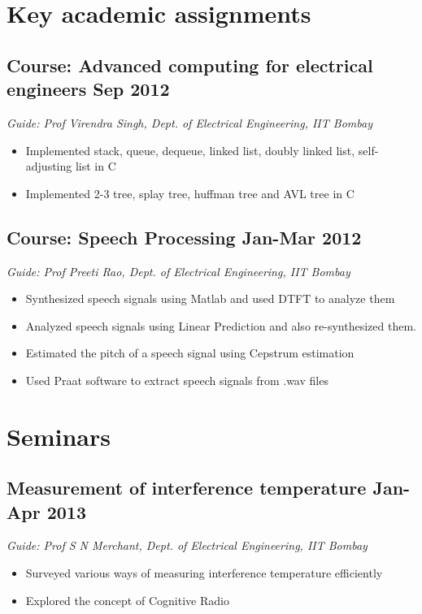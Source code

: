 \documentclass[12pt]{article}
\begin{document}
\section*{Key academic assignments}
\subsection*{Course: Advanced computing for electrical engineers \hfill Sep 2012}
\emph{Guide: Prof Virendra Singh, Dept. of Electrical Engineering, IIT Bombay}
\begin{itemize}
\item Implemented stack, queue, dequeue, linked list, doubly linked list, self-adjusting list in C
\item Implemented 2-3 tree, splay tree,  huffman tree and AVL tree in C
\end{itemize}

\subsection*{Course: Speech Processing \hfill Jan-Mar 2012}
\emph{Guide: Prof Preeti Rao, Dept. of Electrical Engineering, IIT Bombay}
\begin{itemize}
\item Synthesized speech signals using Matlab and used DTFT to analyze them
\item Analyzed speech signals using Linear Prediction and also re-synthesized them.
\item Estimated the pitch of a speech signal using Cepstrum estimation
\item Used Praat software to extract speech signals from .wav files
\end{itemize}


\section*{Seminars}
\subsection*{Measurement of interference temperature \hfill  Jan-Apr 2013}
\emph{Guide: Prof S N Merchant, Dept. of Electrical Engineering, IIT Bombay}
\begin{itemize}  
\item Surveyed various ways of measuring interference temperature efficiently 
\item Explored the concept of Cognitive Radio
\end{itemize}
  
\end{document}
